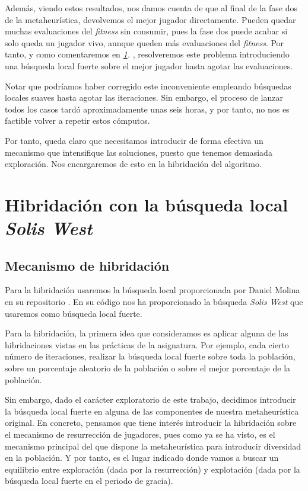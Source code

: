 \documentclass[11pt]{article}
\begin{document}
Además, viendo estos resultados, nos damos cuenta de que al final de la fase dos de la metaheurística, devolvemos el mejor jugador directamente. Pueden quedar muchas evaluaciones del \emph{fitness} sin consumir, pues la fase dos puede acabar si solo queda un jugador vivo, aunque queden más evaluaciones del \emph{fitness}. Por tanto, y como comentaremos en \emph{\ref{hibridacion}. }, resolveremos este problema introduciendo una búsqueda local fuerte sobre el mejor jugador hasta agotar las evaluaciones.

Notar que podríamos haber corregido este inconveniente empleando búsquedas locales suaves hasta agotar las iteraciones. Sin embargo, el proceso de lanzar todos los casos tardó aproximadamente unas seis horas, y por tanto, no nos es factible volver a repetir estos cómputos.

Por tanto, queda claro que necesitamos introducir de forma efectiva un mecanismo que intensifique las soluciones, puesto que tenemos demasiada exploración. Nos encargaremos de esto en la hibridación del algoritmo.

\pagebreak
\section{Hibridación con la búsqueda local \emph{Solis West}} \label{hibridacion}

\subsection{Mecanismo de hibridación}

Para la hibridación usaremos la búsqueda local proporcionada por Daniel Molina en su repositorio \cite{daniel_repo:online}. En su código nos ha proporcionado la búsqueda \emph{Solis West} que usaremos como búsqueda local fuerte.

Para la hibridación, la primera idea que consideramos es aplicar alguna de las hibridaciones vistas en las prácticas de la asignatura. Por ejemplo, cada cierto número de iteraciones, realizar la búsqueda local fuerte sobre toda la población, sobre un porcentaje aleatorio de la población o sobre el mejor porcentaje de la población.

Sin embargo, dado el carácter exploratorio de este trabajo, decidimos introducir la búsqueda local fuerte en alguna de las componentes de nuestra metaheurística original. En concreto, pensamos que tiene interés introducir la hibridación sobre el mecanismo de resurrección de jugadores, pues como ya se ha visto, es el mecanismo principal del que dispone la metaheurística para introducir diversidad en la población. Y por tanto, es el lugar indicado donde vamos a buscar un equilibrio entre exploración (dada por la resurrección) y explotación (dada por la búsqueda local fuerte en el periodo de gracia).
\end{document}
